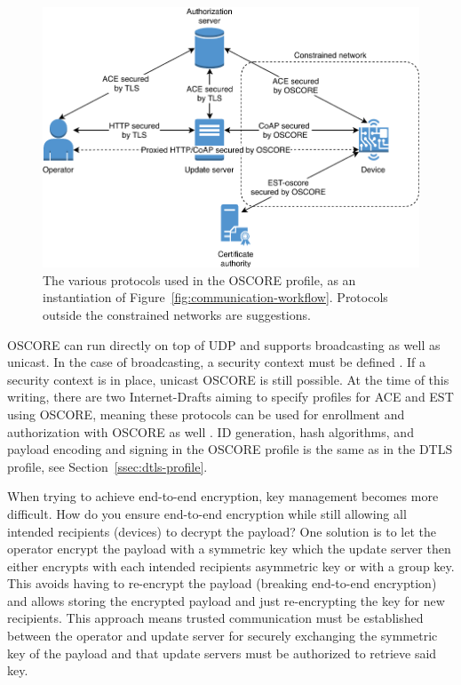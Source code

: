 \documentclass[0-thesis.tex]{subfiles}
\begin{document}
\begin{figure}[t]
    \caption[The various protocols used in the OSCORE profile.]
        {The various protocols used in the OSCORE profile, as an instantiation of
            Figure~\ref{fig:communication-workflow}. Protocols outside the constrained networks are suggestions.}
    \label{fig:oscore-profile}
    \includegraphics{images/oscore-profile.pdf}
\end{figure}

OSCORE can run directly on top of UDP and supports broadcasting as well as unicast. In the
case of broadcasting, a security context must be defined \parencite{oscore-group}. If a
security context is in place, unicast OSCORE is still possible. At the time of this
writing, there are two Internet-Drafts aiming to specify profiles for ACE and EST using
OSCORE, meaning these protocols can be used for enrollment and authorization with OSCORE
as well \parencite{ace-oscore, est-oscore}. ID generation, hash algorithms, and payload
encoding and signing in the OSCORE profile is the same as in the DTLS profile, see
Section~\ref{ssec:dtls-profile}.

When trying to achieve end-to-end encryption, key management becomes more difficult. How
do you ensure end-to-end encryption while still allowing all intended recipients (devices)
to decrypt the payload? One solution is to let the operator encrypt the payload with a
symmetric key which the update server then either encrypts with each intended recipients
asymmetric key or with a group key. This avoids having to re-encrypt the payload (breaking
end-to-end encryption) and allows storing the encrypted payload and just re-encrypting the
key for new recipients. This approach means trusted communication must be established
between the operator and update server for securely exchanging the symmetric key of the
payload and that update servers must be authorized to retrieve said key.
\end{document}
